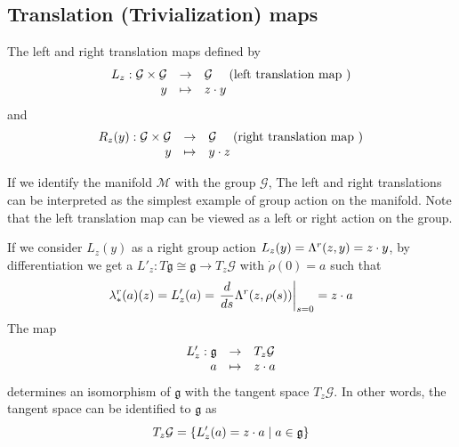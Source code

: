\subsection{Translation (Trivialization) maps}
The left and right translation maps defined by
\begin{equation}
  \label{eq:148}
  \begin{array}{rcl}
    L_z  : \mathcal G \times \mathcal G &\rightarrow& \mathcal G \quad \text{ (left translation map )} \\
    y &\mapsto&  z \cdot y
  \end{array}
\end{equation}
and
\begin{equation}
  \label{eq:149}
  \begin{array}{rcl}
    R_z(y)  :  \mathcal G \times  \mathcal G  & \rightarrow& \mathcal G \quad \text{ (right translation map )} \\
    y  &\mapsto&  y \cdot z
  \end{array}
\end{equation}

If we identify the manifold $\mathcal M$ with the group $\mathcal G$, The left and right translations can be interpreted as the simplest example of group action on the manifold. Note that the left translation map can be viewed as a left or right action on the group.

If we consider $L_z(y)$ as a right group action $ L_z(y) = \Lambda^r( z, y) =z \cdot y $, by differentiation we get a $L'_z : T \mathfrak g \cong  \mathfrak g \rightarrow T_z\mathcal G$ with $\dot\rho (0)=a$ such that
\begin{equation}
  \label{eq:150}
  \lambda^r_{*}(a)(z) = L'_z(a) = \left.\frac{d}{ds}{ \Lambda^r (z, \rho(s))}\right|_{s=0} = z \cdot a
\end{equation}
The map
\begin{equation}
  \label{eq:152}
  \begin{array}{rcl}
  L'_z  : \mathfrak g &\rightarrow& T_z\mathcal G  \\
         a &\mapsto&  z \cdot a
  \end{array}
\end{equation}
determines an isomorphism of $\mathfrak g$ with the tangent space  $T_z\mathcal G$. In other words, the  tangent space can be identified to $\mathfrak g$ as
\begin{equation}
  \label{eq:153}
  T_z\mathcal G =\{L'_z(a) = z \cdot a \mid a \in \mathfrak g  \}
\end{equation}

